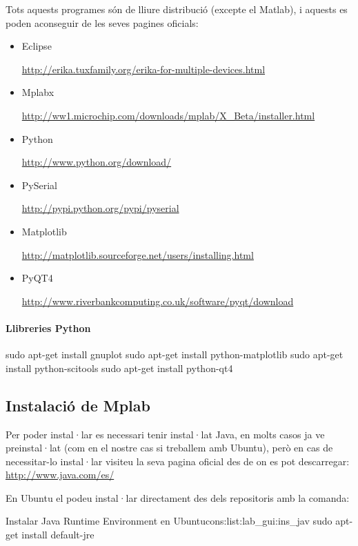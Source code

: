 Tots aquests programes són de lliure distribució (excepte el Matlab), i aquests es poden aconseguir de les seves pagines oficials:

\begin{itemize} 
	\item Eclipse
	
		\url{http://erika.tuxfamily.org/erika-for-multiple-devices.html}
	\item Mplabx
	
		\url{http://ww1.microchip.com/downloads/mplab/X_Beta/installer.html}
	\item Python
	
		\url{http://www.python.org/download/}
	\item PySerial
	
		\url{http://pypi.python.org/pypi/pyserial}
	\item Matplotlib
	
		\url{http://matplotlib.sourceforge.net/users/installing.html}
		
	\item PyQT4
	
		\url{http://www.riverbankcomputing.co.uk/software/pyqt/download}
\end{itemize}

\paragraph{Llibreries Python}
	sudo apt-get install gnuplot
	sudo apt-get install python-matplotlib
	sudo apt-get install python-scitools
	sudo apt-get install python-qt4
	
	
\subsection{Instalació de Mplab}

Per poder instal·lar \MplabX es necessari tenir instal·lat Java, en molts casos ja ve preinstal·lat (com en el nostre cas si treballem amb Ubuntu), però en cas de necessitar-lo instal·lar visiteu la seva pagina oficial des de on es pot descarregar:
	\url{http://www.java.com/es/}

En Ubuntu el podeu instal·lar directament des dels repositoris amb la comanda:

\begin{code_bash}{Instalar Java Runtime Environment en Ubuntu}{cons:list:lab_gui:ins_jav}
sudo apt-get install default-jre
\end{code_bash}

